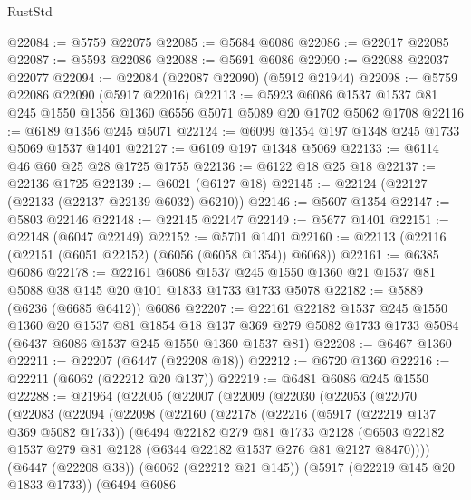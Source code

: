 \begin{lexlean}{RustStd}
\begin{coremodule}
@22084 := @5759 @22075
@22085 := @5684 @6086
@22086 := @22017 @22085
@22087 := @5593 @22086
@22088 := @5691 @6086
@22090 := @22088 @22037 @22077
@22094 := @22084 (@22087 @22090) (@5912 @21944)
@22098 := @5759 @22086 @22090 (@5917 @22016)
@22113 := @5923 @6086 @1537 @1537 @81 @245 @1550 @1356 @1360 @6556 @5071 @5089 @20 @1702 @5062 @1708
@22116 := @6189 @1356 @245 @5071
@22124 := @6099 @1354 @197 @1348 @245 @1733 @5069 @1537 @1401
@22127 := @6109 @197 @1348 @5069
@22133 := @6114 @46 @60 @25 @28 @1725 @1755
@22136 := @6122 @18 @25 @18
@22137 := @22136 @1725
@22139 := @6021 (@6127 @18)
@22145 := @22124 (@22127 (@22133 (@22137 @22139 @6032) @6210))
@22146 := @5607 @1354
@22147 := @5803 @22146
@22148 := @22145 @22147
@22149 := @5677 @1401
@22151 := @22148 (@6047 @22149)
@22152 := @5701 @1401
@22160 := @22113 (@22116 (@22151 (@6051 @22152) (@6056 (@6058 @1354)) @6068))
@22161 := @6385 @6086
@22178 := @22161
    @6086
    @1537
    @245
    @1550
    @1360
    @21
    @1537
    @81
    @5088
    @38
    @145
    @20
    @101
    @1833
    @1733
    @1733
    @5078
@22182 := @5889 (@6236 (@6685 @6412)) @6086
@22207 := @22161
    @22182
    @1537
    @245
    @1550
    @1360
    @20
    @1537
    @81
    @1854
    @18
    @137
    @369
    @279
    @5082
    @1733
    @1733
    @5084
    (@6437 @6086 @1537 @245 @1550 @1360 @1537 @81)
@22208 := @6467 @1360
@22211 := @22207 (@6447 (@22208 @18))
@22212 := @6720 @1360
@22216 := @22211 (@6062 (@22212 @20 @137))
@22219 := @6481 @6086 @245 @1550
@22288 := @21964
    (@22005
      (@22007
        (@22009
          (@22030
            (@22053
              (@22070
                (@22083
                  (@22094
                    (@22098
                      (@22160
                        (@22178
                          (@22216
                            (@5917 (@22219 @137 @369 @5082 @1733))
                            (@6494
                              @22182
                              @279
                              @81
                              @1733
                              @2128
                              (@6503
                                @22182
                                @1537
                                @279
                                @81
                                @2128
                                (@6344 @22182 @1537 @276 @81 @2127 @8470))))
                          (@6447 (@22208 @38))
                          (@6062 (@22212 @21 @145))
                          (@5917 (@22219 @145 @20 @1833 @1733))
                          (@6494
                            @6086

\end{coremodule}
\end{lexlean}
